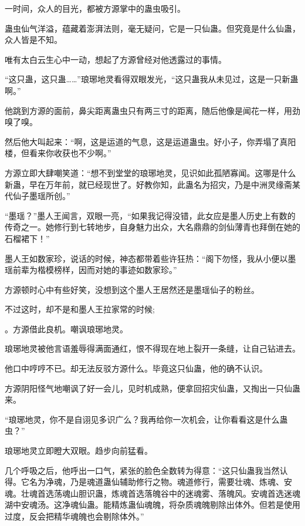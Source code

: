 
\begin{this_body}

一时间，众人的目光，都被方源掌中的蛊虫吸引。

蛊虫仙气洋溢，蕴藏着澎湃法则，毫无疑问，它是一只仙蛊。但究竟是什么仙蛊，众人皆是不知。

唯有太白云生心中一动，想起了方源曾经对他透露过的事情。

“这只蛊，这只蛊……”琅琊地灵看得双眼发光，“这只蛊我从未见过，这是一只新蛊啊。”

他跳到方源的面前，鼻尖距离蛊虫只有两三寸的距离，随后他像是闻花一样，用劲嗅了嗅。

然后他大叫起来：“啊，这是运道的气息，这是运道蛊虫。好小子，你弄塌了真阳楼，但看来你收获也不少啊。”

方源立即大肆嘲笑道：“想不到堂堂的琅琊地灵，见识如此孤陋寡闻。这哪是什么新蛊，早在万年前，就已经现世了。好教你知，此蛊名为招灾，乃是中洲灵缘斋某代仙子墨瑶所创。”

“墨瑶？”墨人王闻言，双眼一亮，“如果我记得没错，此女应是墨人历史上有数的传奇之一。她修行到七转地步，自身魅力出众，大名鼎鼎的剑仙薄青也拜倒在她的石榴裙下！”

墨人王如数家珍，说话的时候，神态都带着些许狂热：“阁下勿怪，我从小便以墨瑶前辈为楷模榜样，因而对她的事迹如数家珍。”

方源顿时心中有些好笑，没想到这个墨人王居然还是墨瑶仙子的粉丝。

不过这时，却不是和墨人王拉家常的时候;

。方源借此良机。嘲讽琅琊地灵。

琅琊地灵被他言语羞辱得满面通红，恨不得现在地上裂开一条缝，让自己钻进去。

他口中哼哼不已。却无法反驳方源什么。毕竟这只仙蛊，他的确不认识。

方源阴阳怪气地嘲讽了好一会儿，见时机成熟，便拿回招灾仙蛊，又掏出一只仙蛊来。

“琅琊地灵，你不是自诩见多识广么？我再给你一次机会，让你看看这是什么蛊虫？”

琅琊地灵立即瞪大双眼。趋步向前猛看。

几个呼吸之后，他呼出一口气，紧张的脸色全数转为得意：“这只仙蛊我当然认得。它名为净魂，乃是魂道蛊仙辅助修行之物。魂道修行，需要壮魂、炼魂、安魂。壮魂首选荡魂山胆识蛊，炼魂首选落魄谷中的迷魂雾、落魄风。安魂首选迷魂湖中安魂汤。这净魂仙蛊。能精炼蛊仙魂魄，将杂质魂魄剔除出体外。但若是使用过度，反会把精华魂魄也会剔除体外。”


\end{this_body}
